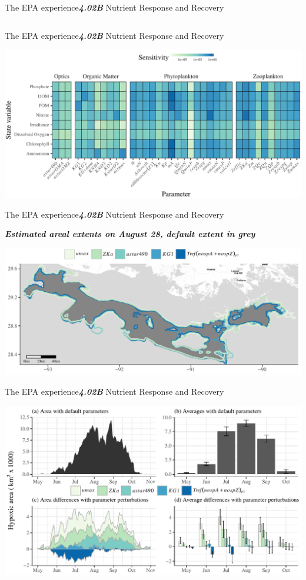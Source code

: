 \documentclass[serif]{beamer}\usepackage[]{graphicx}\usepackage[]{color}
\newcommand{\emtxt}[1]{\textbf{\textit{#1}}}
\begin{document}
\begin{frame}{The EPA experience}{\emtxt{4.02B} Nutrient Response and Recovery}
\begin{columns}
\begin{column}{0.5\textwidth}
\end{column}
\end{columns}
\end{frame}



\begin{frame}{The EPA experience}{\emtxt{4.02B} Nutrient Response and Recovery}
\centerline{\includegraphics[width=\textwidth]{fig/senstile.pdf}}
\end{frame}



\begin{frame}{The EPA experience}{\emtxt{4.02B} Nutrient Response and Recovery}
\centerline{\emtxt{Estimated areal extents on August 28, default extent in grey}}
\vspace{0.15in}
\centerline{\includegraphics[width=\textwidth]{fig/areachg2.pdf}}
\end{frame}

\begin{frame}{The EPA experience}{\emtxt{4.02B} Nutrient Response and Recovery}
\centerline{\includegraphics[width=\textwidth]{fig/areachg1.pdf}}
\end{frame}
\end{document}
